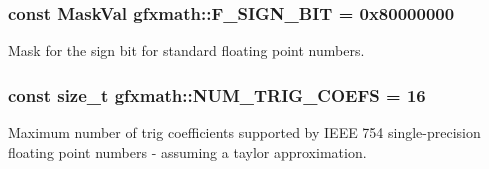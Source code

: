 \subsubsection[{F\+\_\+\+S\+I\+G\+N\+\_\+\+B\+I\+T}]{\setlength{\rightskip}{0pt plus 5cm}const Mask\+Val gfxmath\+::\+F\+\_\+\+S\+I\+G\+N\+\_\+\+B\+I\+T = 0x80000000}\label{group___scalar_math_consts_gad2489c06f986e5af29bfb5c2eaca185f}


Mask for the sign bit for standard floating point numbers. 

\hypertarget{group___scalar_math_consts_ga090f5a34fbed01148a6f72dc1abb00e9}{}
\subsubsection[{N\+U\+M\+\_\+\+T\+R\+I\+G\+\_\+\+C\+O\+E\+F\+S}]{\setlength{\rightskip}{0pt plus 5cm}const size\+\_\+t gfxmath\+::\+N\+U\+M\+\_\+\+T\+R\+I\+G\+\_\+\+C\+O\+E\+F\+S = 16}\label{group___scalar_math_consts_ga090f5a34fbed01148a6f72dc1abb00e9}


Maximum number of trig coefficients supported by I\+E\+E\+E 754 single-\/precision floating point numbers -\/ assuming a taylor approximation. 

